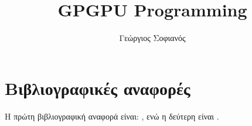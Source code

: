 \documentclass[11pt,a4paper,twoside]{book}
\author{Γεώργιος Σοφιανός}
\title{GPGPU Programming}
\begin{document}

 
\tableofcontents






\section{Βιβλιογραφικές αναφορές}
H πρώτη βιβλιογραφική αναφορά είναι: \parencite{doe}, ενώ η δεύτερη είναι \parencite{papadopoulos}.

\printbibliography[title={Βιβλιογραφία}]
\end{document}
